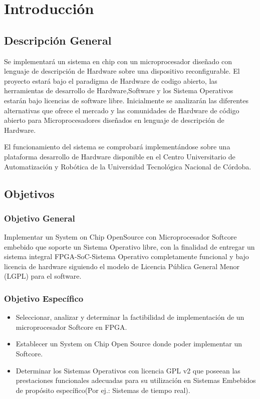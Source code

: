 \chapter{Introducción}

\section{Descripción General}
Se implementará un sistema en chip con  un microprocesador diseñado con lenguaje de descripción de Hardware sobre una dispositivo reconfigurable. El proyecto estará bajo el paradigma de Hardware de codigo abierto, las herramientas de desarrollo de Hardware,Software y los Sistema Operativos estarán bajo licencias de software libre. Inicialmente se analizarán las diferentes alternativas que ofrece el mercado y las comunidades de Hardware de código abierto para  Microprocesadores diseñados en lenguaje de descripción de Hardware.

El funcionamiento del sistema se comprobará implementándose sobre una plataforma desarrollo de Hardware disponible en el Centro Universitario de Automatización y Robótica de la Universidad Tecnológica Nacional de Córdoba.



\section{Objetivos}
\subsection{Objetivo General}

Implementar un System on Chip OpenSource con Microprocesador Softcore embebido que soporte un Sistema Operativo libre, con la finalidad de entregar
un sistema integral FPGA-SoC-Sistema Operativo completamente funcional y bajo licencia de hardware siguiendo el modelo de Licencia Pública General Menor (LGPL) para el software.


\subsection{Objetivo Específico}
\begin{itemize}
\item Seleccionar, analizar y determinar la factibilidad de implementación de un microprocesador Softcore en FPGA.
\item Establecer un System on Chip Open Source donde poder implementar un Softcore.
\item Determinar los Sistemas Operativos con licencia GPL v2 que poseean las prestaciones funcionales adecuadas para su utilización en Sistemas
Embebidos de propósito específico(Por ej.: Sistemas de tiempo real).
\end{itemize}

